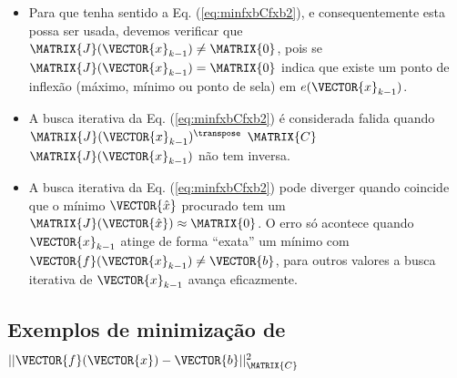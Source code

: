 \begin{theorem}
\begin{itemize}
\item Para que tenha sentido a Eq. (\ref{eq:minfxbCfxb2}),
 e consequentemente esta possa ser usada, devemos verificar que  $\MATRIX{J}(\VECTOR{x}_{k-1})\neq \MATRIX{0}$,
pois se $\MATRIX{J}(\VECTOR{x}_{k-1})= \MATRIX{0}$ indica que existe um ponto de inflexão 
(máximo, mínimo ou ponto de sela) em $e(\VECTOR{x}_{k-1})$.
\item A busca iterativa da Eq. (\ref{eq:minfxbCfxb2}) é considerada falida quando 
$\MATRIX{J}(\VECTOR{x}_{k-1})^{\transpose}$ $\MATRIX{C}$ $\MATRIX{J}(\VECTOR{x}_{k-1})$
não tem inversa.
\item A busca iterativa da Eq. (\ref{eq:minfxbCfxb2}) pode diverger quando coincide que o mínimo $\VECTOR{\hat{x}}$ procurado
tem um $\MATRIX{J}(\VECTOR{\hat{x}})\approx \MATRIX{0}$.
O erro só acontece quando $\VECTOR{x}_{k-1}$ atinge de forma ``exata'' um mínimo com $\VECTOR{f}(\VECTOR{x}_{k-1})\neq \VECTOR{b}$,
para outros valores a busca iterativa de $\VECTOR{x}_{k-1}$ avança eficazmente.
\end{itemize}

\end{theorem}
\subsection{Exemplos de minimização de $||\VECTOR{f}(\VECTOR{x})-\VECTOR{b}||_{\MATRIX{C}}^2$}

